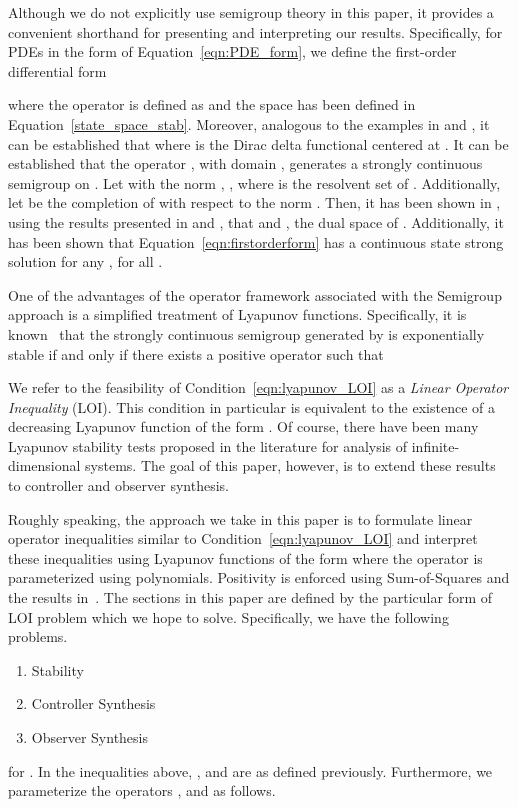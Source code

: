 \documentclass[9pt,journal,twocolumn]{IEEEtran}
\begin{document}
Although we do not explicitly use semigroup theory in this paper, it provides a convenient shorthand for presenting and interpreting our results. Specifically, for PDEs in the form of Equation~\eqref{eqn:PDE_form}, we define the first-order differential form

where the operator  is defined as
 and the space  has been defined in Equation~\eqref{state_space_stab}.
Moreover, analogous to the examples in \cite{van1993h} and \cite{byrnes1999example}, it can be established that
 where  is the Dirac delta functional centered at . It can be established that the operator , with domain , generates a strongly continuous semigroup  on  \cite{curtain1995introduction}. Let  with the norm , , where  is the resolvent set of . Additionally, let  be the completion of  with respect to the norm . Then, it has been shown in \cite{harkort2011discrete}, using the results presented in \cite{nagel2000one} and \cite{weiss1989representation}, that  and , the dual space of . Additionally, it has been shown that Equation~\eqref{eqn:firstorderform} has a continuous state strong solution  for any , for all .  

One of the advantages of the operator framework associated with the Semigroup approach is a simplified treatment of Lyapunov functions. Specifically, it is known~\cite{curtain1995introduction} that the strongly continuous semigroup  generated by  is exponentially stable if and only if there exists a positive operator  such that


We refer to the feasibility of Condition~\eqref{eqn:lyapunov_LOI} as a \emph{Linear Operator Inequality} (LOI). This condition in particular is equivalent to the existence of a decreasing Lyapunov function of the form . Of course, there have been many Lyapunov stability tests proposed in the literature for analysis of infinite-dimensional systems. The goal of this paper, however, is to extend these results to controller and observer synthesis.

Roughly speaking, the approach we take in this paper is to formulate linear operator inequalities similar to Condition~\eqref{eqn:lyapunov_LOI} and interpret these inequalities using Lyapunov functions of the form  where the operator  is parameterized using polynomials. Positivity is enforced using Sum-of-Squares and the results in~\cite{peetlmi}. The sections in this paper are defined by the particular form of LOI problem which we hope to solve. Specifically, we have the following problems.
\begin{enumerate}
\item Stability

\item Controller Synthesis

\item Observer Synthesis

\end{enumerate} for .
In the inequalities above, ,  and  are as defined previously.
Furthermore, we parameterize the operators ,  and  as follows.
\end{document}
